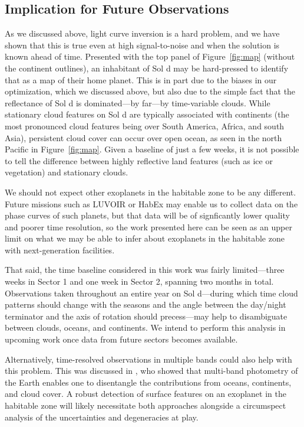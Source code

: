\documentclass[modern]{aastex62}
\begin{document}
\subsection{Implication for Future Observations}
\label{sec:otherplanets}

As we discussed above, light curve inversion is a hard problem,
and we have shown that this is true even at high signal-to-noise and 
when the solution is
known ahead of time. Presented with the top panel of Figure~\ref{fig:map}
(without the continent outlines),
an inhabitant of Sol d may be hard-pressed to identify that
as a map of their home planet. This is in part due to the biases
in our optimization, which we discussed above, but also due to the 
simple fact that the reflectance of Sol d is dominated---by far---by 
time-variable clouds. While stationary cloud features on Sol d are
typically associated with continents (the most pronounced cloud features
being over South America, Africa, and south Asia), persistent cloud
cover can occur over open ocean, as seen in the north Pacific
in Figure~\ref{fig:map}. Given a baseline of just a few weeks, it is
not possible to tell the difference between highly reflective land
features (such as ice or vegetation) and stationary clouds.

We should not expect other exoplanets in the habitable zone to be
any different. Future missions such as LUVOIR or HabEx may enable
us to collect data on the phase curves of such planets, but that
data will be of signficantly lower quality and poorer time resolution,
so the work presented here can be seen as an upper limit on what we may
be able to infer about exoplanets in the habitable zone with
next-generation facilities.

That said, the time baseline considered in this work was fairly
limited---three weeks in Sector 1 and one week in Sector 2,
spanning two months in total. Observations taken throughout an entire
year on Sol d---during which time cloud patterns should change with the
seasons and the angle between the day/night terminator and the 
axis of rotation should precess---may help to disambiguate between
clouds, oceans, and continents. We intend to perform this analysis
in upcoming work once data from future \TESS sectors becomes available.

Alternatively, time-resolved observations in multiple bands could
also help with this problem. This was discussed in \cite{Cowan2009},
who showed that multi-band photometry of the Earth enables one to
disentangle the contributions from oceans, continents, and cloud cover.
A robust detection of surface features on an exoplanet in the habitable
zone will likely necessitate both approaches alongside a circumspect
analysis of the uncertainties and degeneracies at play.
\end{document}
